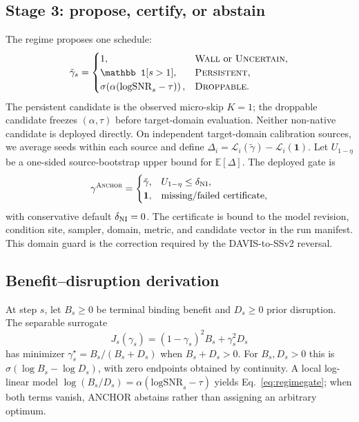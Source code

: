 \documentclass[letterpaper]{article}
\newcommand{\method}{\textsc{Anchor}}
\newcommand{\lsnr}{\mathrm{logSNR}}
\begin{document}
\subsection{Stage 3: propose, certify, or abstain}
The regime proposes one schedule:
\begin{equation}
\tilde\gamma_s=\begin{cases}
1, & \textsc{Wall}\text{ or }\textsc{Uncertain},\\
\mathbb 1[s>1], & \textsc{Persistent},\\
\sigma\!\left(\alpha(\lsnr_s-\tau)\right), & \textsc{Droppable}.
\end{cases}
\label{eq:regimegate}
\end{equation}
The persistent candidate is the observed micro-skip $K{=}1$; the droppable
candidate freezes $(\alpha,\tau)$ before target-domain evaluation. Neither
non-native candidate is deployed directly. On independent target-domain
calibration sources, we average seeds within each source and define
$\Delta_i=\mathcal L_i(\tilde\gamma)-\mathcal L_i(\mathbf1)$. Let
$U_{1-\eta}$ be a one-sided source-bootstrap upper bound for
$\mathbb E[\Delta]$. The deployed gate is
\begin{equation}
\gamma^{\method}=\begin{cases}
\tilde\gamma, & U_{1-\eta}\le\delta_{\rm NI},\\
\mathbf1, & \text{missing/failed certificate},
\end{cases}
\label{eq:guard}
\end{equation}
with conservative default $\delta_{\rm NI}=0$. The certificate is bound to
the model revision, condition site, sampler, domain, metric, and candidate
vector in the run manifest. This domain guard is the correction required by
the DAVIS-to-SSv2 reversal.

\subsection{Benefit--disruption derivation}
At step $s$, let $B_s\ge0$ be terminal binding benefit and $D_s\ge0$ prior
disruption. The separable surrogate
\begin{equation}
J_s(\gamma_s)=(1-\gamma_s)^2B_s+\gamma_s^2D_s
\label{eq:tradeoff}
\end{equation}
has minimizer
$\gamma_s^\star=B_s/(B_s+D_s)$ when $B_s+D_s>0$. For $B_s,D_s>0$ this is
$\sigma(\log B_s-\log D_s)$, with zero endpoints obtained by continuity.
A local log-linear model
$\log(B_s/D_s)=\alpha(\lsnr_s-\tau)$ yields
Eq.~\eqref{eq:regimegate}; when both terms vanish, ANCHOR abstains rather
than assigning an arbitrary optimum.
\end{document}
